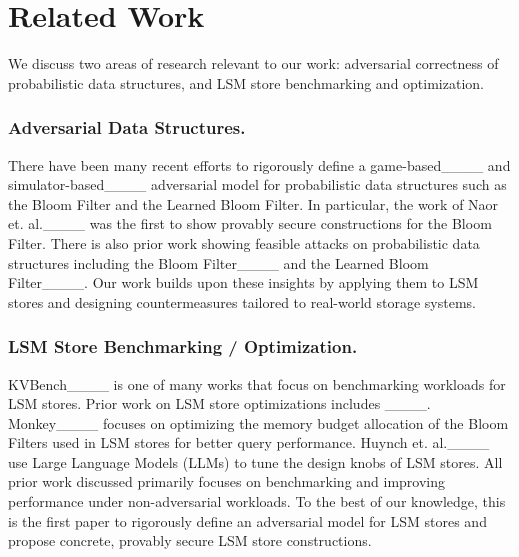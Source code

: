 \section{Related Work}
We discuss two areas of research relevant to our work: adversarial correctness of probabilistic data structures, and LSM store benchmarking and optimization.

\subsubsection*{Adversarial Data Structures.} There have been many recent efforts to rigorously define a game-based____ and simulator-based____ adversarial model for probabilistic data structures such as the Bloom Filter and the Learned Bloom Filter. In particular, the work of Naor et. al.____ was the first to show provably secure constructions for the Bloom Filter. There is also prior work showing feasible attacks on probabilistic data structures including the Bloom Filter____ and the Learned Bloom Filter____. 
Our work builds upon these insights by applying them to LSM stores and designing countermeasures tailored to real-world storage systems. 

\subsubsection*{LSM Store Benchmarking / Optimization.} KVBench____ is one of many works that focus on benchmarking workloads for LSM stores. Prior work on LSM store optimizations includes ____. Monkey____ focuses on optimizing the memory budget allocation of the Bloom Filters used in LSM stores for better query performance. Huynch et. al.____ use Large Language Models (LLMs) to tune the design knobs of LSM stores. All prior work discussed primarily focuses on benchmarking and improving performance under non-adversarial workloads. To the best of our knowledge, this is the first paper to rigorously define an adversarial model for LSM stores and propose concrete, provably secure LSM store constructions.